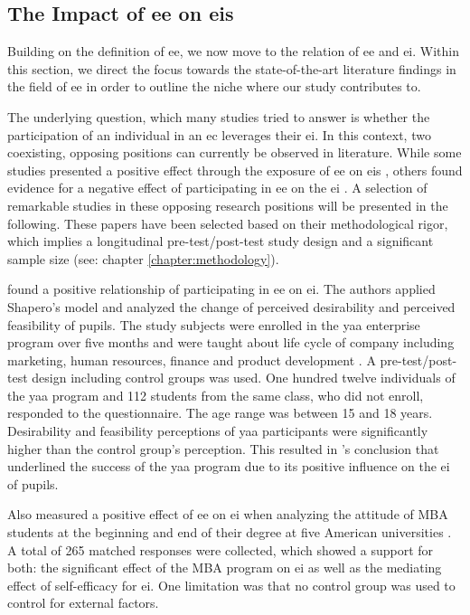 \subsection{The Impact of \acl{ee} on \aclp{ei}}
\label{sec:impact-ee-ei}

Building on the definition of \acf{ee}, we now move to the relation of \ac{ee} and \ac{ei}. Within this section, we direct the focus towards the state-of-the-art literature findings in the field of \ac{ee} in order to outline the niche where our study contributes to. 

The underlying question, which many studies tried to answer is whether the participation of an individual in an \ac{ec} leverages their \ac{ei}.
In this context, two coexisting, opposing positions can currently be observed in literature. 
While some studies presented a positive effect through the exposure of  \ac{ee} on \acp{ei} \citep{peterman2003enterprise,zhao2005mediating,solesvik2013entrepreneurial}, others found evidence for a negative effect of participating in \ac{ee} on the \ac{ei} \citep{von2010effects,oosterbeek2010impact}. A selection of remarkable studies in these opposing research positions will be presented in the following. These papers have been selected based on their methodological rigor, which implies a longitudinal pre-test/post-test study design and a significant sample size (see: chapter \ref{chapter:methodology}).

\citet{peterman2003enterprise} found a positive relationship of participating in \ac{ee} on \ac{ei}. The authors applied Shapero's model and analyzed the change of perceived desirability and perceived feasibility of pupils. The study subjects were enrolled in the \acf{yaa} enterprise program over five months and were taught about life cycle of company including marketing, human resources, finance and product development \citep{peterman2003enterprise}. A pre-test/post-test design including control groups was used. One hundred twelve individuals of the \ac{yaa} program and 112 students from the same class, who did not enroll, responded to the questionnaire. The age range was between 15 and 18 years. Desirability and feasibility perceptions of \ac{yaa} participants were significantly higher than the control group's perception. This resulted in \citet{peterman2003enterprise}'s conclusion that underlined the success of the \ac{yaa} program due to its positive influence on the \ac{ei} of pupils.

Also \citet{zhao2005mediating} measured a positive effect of \ac{ee} on \ac{ei} when analyzing the attitude of MBA students at the beginning and end of their degree at five American universities  \citep{zhao2005mediating}. A total of 265 matched responses were collected, which showed a support for both: the significant effect of the MBA program on \ac{ei} as well as the mediating effect of self-efficacy for \ac{ei}. One limitation was that no control group was used to control for external factors.

